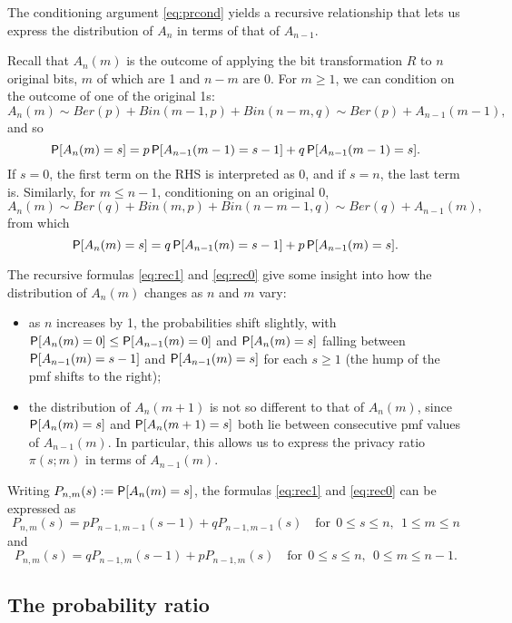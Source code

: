 \documentclass[11pt]{article}
\begin{document}
The conditioning argument \eqref{eq:prcond} yields a recursive relationship that lets us express the distribution of $A_n$ in terms of that of $A_{n-1}$.

Recall that $A_n(m)$ is the outcome of applying the bit transformation $R$ to $n$ original bits, $m$ of which are 1 and $n-m$ are 0.
For $m \geq 1$, we can condition on the outcome of one of the original 1s:
\[ A_n(m) \sim Ber(p) + Bin(m-1, p) + Bin(n-m, q) \sim Ber(p) + A_{n-1}(m-1), \]
and so
\begin{equation}\label{eq:rec1}
\P[A_n(m) = s] = p\P[A_{n-1}(m-1) = s-1] + q\P[A_{n-1}(m-1) = s].
\end{equation}
If $s = 0$, the first term on the RHS is interpreted as 0, and if $s = n$, the last term is.
Similarly, for $m \leq n-1$, conditioning on an original 0,
\[ A_n(m) \sim Ber(q) + Bin(m, p) + Bin(n-m-1, q) \sim Ber(q) + A_{n-1}(m), \]
from which
\begin{equation}\label{eq:rec0}
\P[A_n(m) = s] = q\P[A_{n-1}(m) = s-1] + p\P[A_{n-1}(m) = s].
\end{equation}

The recursive formulas \eqref{eq:rec1} and \eqref{eq:rec0} give some insight into how the distribution of $A_n(m)$ changes as $n$ and $m$ vary:
\begin{itemize}
\item  as $n$ increases by 1, the probabilities shift slightly, with $\P[A_n(m) = 0] \leq \P[A_{n-1}(m) = 0]$ and
$\P[A_n(m) = s]$ falling between $\P[A_{n-1}(m) = s-1]$ and $\P[A_{n-1}(m) = s]$ for each $s\geq 1$ (\ie the hump of the pmf shifts to the right);
\item the distribution of $A_n(m+1)$ is not so different to that of $A_n(m)$, since $\P[A_n(m) = s]$ and $\P[A_n(m+1) = s]$ both lie between consecutive pmf values of $A_{n-1}(m)$. In particular, this allows us to express the privacy ratio $\pi(s;m)$ in terms of $A_{n-1}(m)$.
\end{itemize}

Writing $P_{n,m}(s) := \P[A_n(m) = s]$, the formulas \eqref{eq:rec1} and \eqref{eq:rec0} can be expressed as
\[ P_{n,m}(s) = pP_{n-1,m-1}(s-1) + qP_{n-1,m-1}(s)
\quad\text{for}\ \ 0 \leq s \leq n,\ \ 1\leq m \leq n 
\]
and
\[ P_{n,m}(s) = qP_{n-1,m}(s-1) + pP_{n-1,m}(s)
\quad\text{for}\ \ 0 \leq s \leq n,\ \ 0\leq m \leq n-1.
\]

\subsection{The probability ratio}
\end{document}
